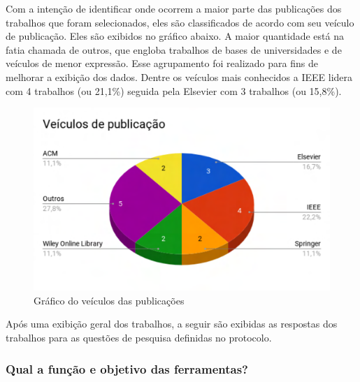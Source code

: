 Com a intenção de identificar onde ocorrem a maior parte das publicações dos trabalhos que foram selecionados, eles são classificados de acordo com seu veículo de publicação. Eles são exibidos no gráfico abaixo. A maior quantidade está na fatia chamada de outros, que engloba trabalhos de bases de universidades e de veículos de menor expressão. Esse agrupamento foi realizado para fins de melhorar a exibição dos dados. Dentre os veículos mais conhecidos a IEEE lidera com 4 trabalhos (ou 21,1\%) seguida pela Elsevier com 3 trabalhos (ou 15,8\%).

\begin{figure}[!htb]
	\caption{Gráfico do veículos das publicações}\label{fig:veiculo}
	\begin{center}
		\includegraphics[scale=0.6]{img/GrafVeiculo}
	\end{center}
\end{figure}

Após uma exibição geral dos trabalhos, a seguir são exibidas as respostas dos trabalhos para as questões de pesquisa definidas no protocolo.
\subsubsection{Qual a função e objetivo das ferramentas?}\label{subsub:trabalhosRelacionados_resultados_questao1}

